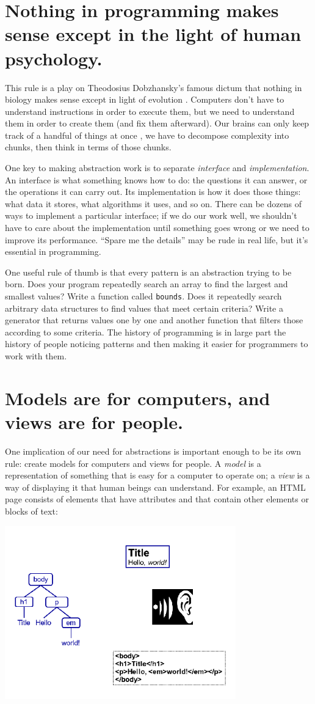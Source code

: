 \documentclass[10pt,letterpaper]{article}
\newcommand{\rulemajor}[1]{\section{#1}}
\begin{document}
\rulemajor{Nothing in programming makes sense except in the light of human psychology.}

This rule is a play on Theodosius Dobzhansky's famous dictum that nothing in
biology makes sense except in light of evolution \cite{Dobz1973}.  Computers
don't have to understand instructions in order to execute them, but we need to
understand them in order to create them (and fix them afterward).  Our brains
can only keep track of a handful of things at once \cite{Mill1956}, we have to
decompose complexity into chunks, then think in terms of those chunks.

One key to making abstraction work is to separate \emph{interface} and
\emph{implementation}.  An interface is what something knows how to do: the
questions it can answer, or the operations it can carry out. Its implementation
is how it does those things: what data it stores, what algorithms it uses, and
so on.  There can be dozens of ways to implement a particular interface; if we
do our work well, we shouldn't have to care about the implementation until
something goes wrong or we need to improve its performance.  ``Spare me the
details'' may be rude in real life, but it's essential in programming.

One useful rule of thumb is that every pattern is an abstraction trying to be
born.  Does your program repeatedly search an array to find the largest and
smallest values?  Write a function called \texttt{bounds}.  Does it repeatedly
search arbitrary data structures to find values that meet certain criteria?
Write a generator that returns values one by one and another function that
filters those according to some criteria.  The history of programming is in
large part the history of people noticing patterns and then making it easier
for programmers to work with them.

\rulemajor{Models are for computers, and views are for people.}

One implication of our need for abstractions is important enough to be its own
rule: create models for computers and views for people.  A \emph{model} is a
representation of something that is easy for a computer to operate on; a
\emph{view} is a way of displaying it that human beings can understand.  For
example, an HTML page consists of elements that have attributes and that contain
other elements or blocks of text:

\includegraphics[width=10.0cm]{modelview.png}
\end{document}
